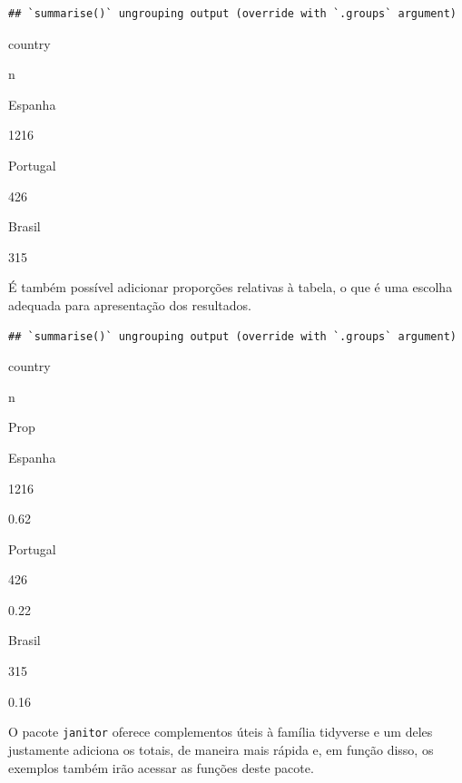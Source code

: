 \documentclass[
]{book}
\newenvironment{Shaded}{\begin{snugshade}}{\end{snugshade}}
\newcommand{\DataTypeTok}[1]{\textcolor[rgb]{0.13,0.29,0.53}{#1}}
\newcommand{\DecValTok}[1]{\textcolor[rgb]{0.00,0.00,0.81}{#1}}
\newcommand{\KeywordTok}[1]{\textcolor[rgb]{0.13,0.29,0.53}{\textbf{#1}}}
\newcommand{\NormalTok}[1]{#1}
\newcommand{\OperatorTok}[1]{\textcolor[rgb]{0.81,0.36,0.00}{\textbf{#1}}}
\newcommand{\StringTok}[1]{\textcolor[rgb]{0.31,0.60,0.02}{#1}}
\begin{document}
\begin{verbatim}
## `summarise()` ungrouping output (override with `.groups` argument)
\end{verbatim}

country

n

Espanha

1216

Portugal

426

Brasil

315

É também possível adicionar proporções relativas à tabela, o que é uma escolha adequada para apresentação dos resultados.

\begin{Shaded}
\end{Shaded}

\begin{verbatim}
## `summarise()` ungrouping output (override with `.groups` argument)
\end{verbatim}

country

n

Prop

Espanha

1216

0.62

Portugal

426

0.22

Brasil

315

0.16

O pacote \texttt{janitor} oferece complementos úteis à família tidyverse e um deles justamente adiciona os totais, de maneira mais rápida e, em função disso, os exemplos também irão acessar as funções deste pacote.
\end{document}
